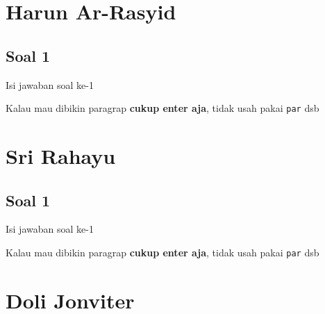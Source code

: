 

\section{Harun Ar-Rasyid}
\subsection{Soal 1}
Isi jawaban soal ke-1

Kalau mau dibikin paragrap \textbf{cukup enter aja}, tidak usah pakai \verb|par| dsb



\section{Sri Rahayu}
\subsection{Soal 1}
Isi jawaban soal ke-1

Kalau mau dibikin paragrap \textbf{cukup enter aja}, tidak usah pakai \verb|par| dsb



\section{Doli Jonviter}
